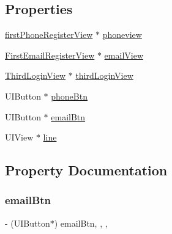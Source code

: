 \subsection*{Properties}
\begin{DoxyCompactItemize}
\item 
\mbox{\hyperlink{interfacefirst_phone_register_view}{first\+Phone\+Register\+View}} $\ast$ \mbox{\hyperlink{category_register_view_controller_07_08_acd47dde8aba4915d2593e4ddbc4d25aa}{phoneview}}
\item 
\mbox{\hyperlink{interface_first_email_register_view}{First\+Email\+Register\+View}} $\ast$ \mbox{\hyperlink{category_register_view_controller_07_08_ad1438c57a69d476cf261b2a5cfd4f7c7}{email\+View}}
\item 
\mbox{\hyperlink{interface_third_login_view}{Third\+Login\+View}} $\ast$ \mbox{\hyperlink{category_register_view_controller_07_08_a09214d1f44e889ecb603cb2dacd9beb1}{third\+Login\+View}}
\item 
U\+I\+Button $\ast$ \mbox{\hyperlink{category_register_view_controller_07_08_ae9c1a9245959dc6562d963ec106d066e}{phone\+Btn}}
\item 
U\+I\+Button $\ast$ \mbox{\hyperlink{category_register_view_controller_07_08_a8aad43484f921189f045389b0b83e525}{email\+Btn}}
\item 
U\+I\+View $\ast$ \mbox{\hyperlink{category_register_view_controller_07_08_ad8b6498ae9d4f511abe3a313dbcddc81}{line}}
\end{DoxyCompactItemize}


\subsection{Property Documentation}
\mbox{\label{category_register_view_controller_07_08_a8aad43484f921189f045389b0b83e525}} 
\subsubsection{\texorpdfstring{email\+Btn}{emailBtn}}
{\footnotesize\ttfamily -\/ (U\+I\+Button$\ast$) email\+Btn\hspace{0.3cm}{\ttfamily [read]}, {\ttfamily [write]}, {\ttfamily [nonatomic]}, {\ttfamily [strong]}}

